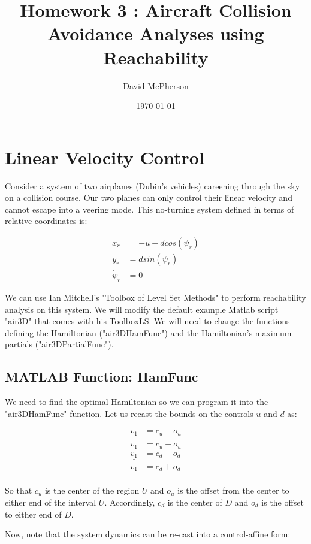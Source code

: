 \documentclass[a4paper]{article}
\title{Homework 3 : Aircraft Collision Avoidance Analyses using Reachability}
\author{David McPherson}
\date{\today}
\begin{document}
\maketitle

\section{Linear Velocity Control}
Consider a system of two airplanes (Dubin's vehicles) careening through the sky on a collision course.
Our two planes can only control their linear velocity and cannot escape into a veering mode.
This no-turning system defined in terms of relative coordinates is:

\begin{align*}
     \dot{x}_r    &= -u + d cos(\psi_r)
  \\ \dot{y}_r    &=  d sin(\psi_r)
  \\ \dot{\psi}_r &=  0
\end{align*}

We can use Ian Mitchell's "Toolbox of Level Set Methods" to perform reachability analysis on this system.
We will modify the default example Matlab script "air3D" that comes with his ToolboxLS.
We will need to change the functions defining the Hamiltonian ("air3DHamFunc") and the Hamiltonian's maximum partials ("air3DPartialFunc").

\subsection{MATLAB Function: HamFunc}

We need to find the optimal Hamiltonian so we can program it into the "air3DHamFunc" function.
Let us recast the bounds on the controls $u$ and $d$ as:

\begin{align*}
  \underline{v_1} &= c_u - o_u \\
  \bar{v_1}       &= c_u + o_u \\
  \underline{v_1} &= c_d - o_d \\
  \bar{v_1}       &= c_d + o_d \\
\end{align*}

So that $c_u$ is the center of the region $U$ and $o_u$ is the offset from the center to either end of the interval $U$.
Accordingly, $c_d$ is the center of $D$ and $o_d$ is the offset to either end of $D$.

Now, note that the system dynamics can be re-cast into a control-affine form:
\end{document}
